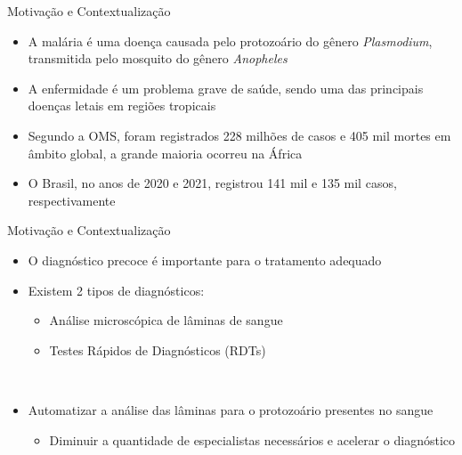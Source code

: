 
\begin{frame}{Motivação e Contextualização}
\begin{itemize}
    \item A malária é uma doença causada pelo protozoário do gênero \emph{Plasmodium}, transmitida pelo mosquito do gênero \emph{Anopheles} \cite{OMS:Malaria2019}
    \ \ \newline
    \item A enfermidade é um problema grave de saúde, sendo uma das principais doenças letais em regiões tropicais \cite{OMS:Malaria2019}
    \ \ \newline
    \item Segundo a OMS, foram registrados 228 milhões de casos e 405 mil mortes em âmbito global, a grande maioria ocorreu na África 
     \ \ \newline
    \item O Brasil, no anos de 2020 e 2021, registrou 141 mil e 135 mil casos, respectivamente \cite{Boletim:Malaria2022}
\end{itemize}
\end{frame}

\begin{frame}{Motivação e Contextualização}
    \begin{itemize}
        \item O diagnóstico precoce é importante para o tratamento adequado \cite{Berzosa:MalariaDiagnostico}
        \ \ \newline
        \item  Existem 2 tipos de diagnósticos: \cite{OMS:Malaria2019}
        \begin{itemize}
            \item Análise microscópica de lâminas de sangue
            \item Testes Rápidos de Diagnósticos (RDTs)
        \end{itemize}
        \ \ \newline
        \item Automatizar a análise das lâminas para o protozoário presentes no sangue
        \begin{itemize}
        \item Diminuir a quantidade de especialistas necessários e acelerar o diagnóstico
        \end{itemize}
    \end{itemize}
\end{frame}

